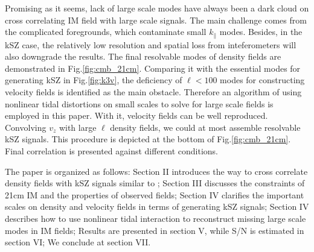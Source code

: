 Promising as it seems, 
lack of large scale modes have always been a dark cloud 
on cross correlating IM field with large scale signals. 
The main challenge comes from the complicated foregrounds, 
which contaminate small $k_\parallel$ modes. 
Besides, in the kSZ case, the relatively low resolution 
and spatial loss from inteferometers 
will also downgrade the results. 
The final resolvable modes of density fields are demonstrated in Fig.\ref{fig:cmb_21cm}.
Comparing it with the essential modes for generating kSZ in Fig.\ref{fig:k3v}, 
the deficiency of $\ell<100$ modes for 
constructing velocity fields is identified as the main obstacle. 
Therefore an algorithm of using nonlinear tidal distortions 
on small scales to solve for large scale fields 
\cite{2012:pen,2015:zhu}
is employed in this paper. 
With it, velocity fields can be well reproduced. 
Convolving $v_z$ with 
large $\ell$ density fields, 
we could at most assemble resolvable kSZ signals. 
This procedure is depicted at the bottom of Fig.\ref{fig:cmb_21cm}. 
Final correlation is presented against different conditions.

The paper is organized as follows: 
Section II introduces the way to 
cross correlate density fields with kSZ signals similar to \cite{Shao11}; 
Section III discusses the constraints of 21cm IM and the properties of observed fields; 
Section IV clarifies the important scales on density and velocity fields in terms of generating 
kSZ signals; 
Section IV describes how to use nonlinear tidal interaction 
to reconstruct missing large scale modes in IM fields; 
Results are presented in section V, 
while S/N is estimated in section VI; 
We conclude at section VII.

